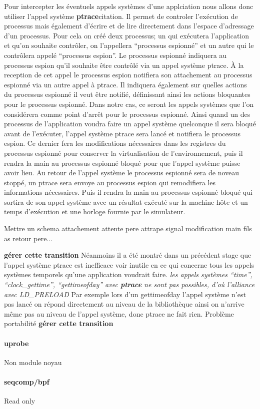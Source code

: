 Pour intercepter les éventuels appels systèmes d'une applciation nous allons
donc utiliser l'appel système \textbf{ptrace}{\color{red}citation}. Il permet de
controler l'exécution de processus mais également d'écrire et de lire
directement dans l'espace d'adressage d'un processus. Pour cela on créé deux
processus; un qui exécutera l'application et qu'on souhaite contrôler, on
l'appellera ``processus espionné'' et un autre qui le contrôlera appelé
``processus espion''. Le processus espionné indiquera au processus espion qu'il
souhaite être contrôlé via un appel système ptrace. À la reception de cet appel
le processus espion notifiera son attachement au processus espionné via un autre
appel à ptrace. Il indiquera également sur quelles actions du processus espionné
il veut être notifié, définissant ainsi les actions bloquantes pour le processus
espionné. Dans notre cas, ce seront les appels systèmes que l'on considérera
comme point d'arrêt pour le processus espionné. Ainsi quand un des processus de
l'application voudra faire un appel système quelconque il sera bloqué avant de
l'exécuter, l'appel système ptrace sera lancé et notifiera le processus
espion. Ce dernier fera les modifications nécessaires dans les registres du
processus espionné pour conserver la virtualisation de l'environnement, puis il
rendra la main au processus espionné bloqué pour que l'appel système puisse
avoir lieu. Au retour de l'appel système le processus espionné sera de noveau
stoppé, un ptrace sera envoye au processus espion qui remodifiera les
informations nécessaires. Puis il rendra la main au processus espionné bloqué
qui sortira de son appel système avec un résultat exécuté sur la machine hôte et
un temps d'exécution et une horloge fournie par le simulateur.

{\color{red} Mettre un schema attachement attente pere attrape signal modification main fils as retour pere...}

{\color{red} \textbf{gérer cette transition}} Néanmoins il a été montré dans un
précédent stage que l'appel système ptrace est inefficace voir inutile en ce qui
concerne tous les appels systèmes temporels qu'une application voudrait
faire. \textit{les appels systèmes ``time'', ``clock\_gettime'',
  ``gettimeofday'' avec \textbf{ptrace} ne sont pas possibles, d'où l'alliance
  avec LD\_PRELOAD} Par exemple lors d'un gettimeofday l'appel système n'est pas
lancé on répond directement au niveau de la bibliothèque ainsi on n'arrive même
pas au niveau de l'appel système, donc ptrace ne fait rien.  Problème
portabilité {\color{red} \textbf{gérer cette transition}}
\paragraph{uprobe}
Non module noyau

\paragraph{seqcomp/bpf}
Read only
